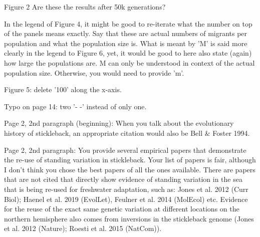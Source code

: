 
\begin{point}{Figure 2}
    Are these the results after 50k generations?
\end{point}


\begin{point}{}
    In the legend of Figure 4, it might be good to re-iterate what the number on top of the panels means exactly. Say that these are actual numbers of migrants per population and what the population size is. What is meant by 'M' is said more clearly in the legend to Figure 6, yet, it would be good to here also state (again) how large the populations are. M can only be understood in context of the actual population size. Otherwise, you would need to provide 'm'.
\end{point}


\begin{point}{}
Figure 5: delete '100' along the x-axis.
\end{point}


\begin{point}{}
Typo on page 14: two '- -' instead of only one.
\end{point}


\begin{point}{}
Page 2, 2nd paragraph (beginning): When you talk about the evolutionary history of stickleback, an appropriate citation would also be Bell \& Foster 1994.
\end{point}


\begin{point}{}
Page 2, 2nd paragraph: You provide several empirical papers that demonstrate the re-use of standing variation in stickleback. Your list of papers is fair, although I don't think you chose the best papers of all the ones available. There are papers that are not cited that directly show evidence of standing variation in the sea that is being re-used for freshwater adaptation, such as: Jones et al. 2012 (Curr Biol); Haenel et al. 2019 (EvolLet), Feulner et al. 2014 (MolEcol) etc. Evidence for the reuse of the exact same genetic variation at different locations on the northern hemisphere also comes from inversions in the stickleback genome (Jones et al. 2012 (Nature); Roesti et al. 2015 (NatCom)).
\end{point}

